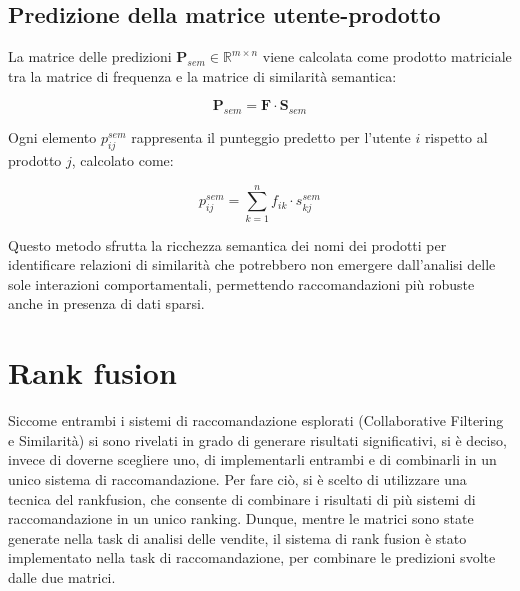 \subsection{Predizione della matrice utente-prodotto}

La matrice delle predizioni $\mathbf{P}_{sem} \in \mathbb{R}^{m \times n}$ viene calcolata come prodotto matriciale tra la matrice di frequenza e la matrice di similarità semantica:

\begin{equation}
\mathbf{P}_{sem} = \mathbf{F} \cdot \mathbf{S}_{sem}
\end{equation}

Ogni elemento $p_{ij}^{sem}$ rappresenta il punteggio predetto per l'utente $i$ rispetto al prodotto $j$, calcolato come:

\begin{equation}
p_{ij}^{sem} = \sum_{k=1}^{n} f_{ik} \cdot s_{kj}^{sem}
\end{equation}

Questo metodo sfrutta la ricchezza semantica dei nomi dei prodotti per identificare relazioni di similarità che potrebbero non emergere dall'analisi delle sole interazioni comportamentali, permettendo raccomandazioni più robuste anche in presenza di dati sparsi.


\section{Rank fusion}

Siccome entrambi i sistemi di raccomandazione esplorati (Collaborative Filtering e Similarità) si sono rivelati in grado di generare risultati significativi, si è deciso, invece di doverne scegliere uno, di implementarli entrambi e di combinarli in un unico sistema di raccomandazione. Per fare ciò, si è scelto di utilizzare una tecnica del \gls{rankfusion}, che consente di combinare i risultati di più sistemi di raccomandazione in un unico ranking.
Dunque, mentre le matrici sono state generate nella task di analisi delle vendite, il sistema di rank fusion è stato implementato nella task di raccomandazione, per combinare le predizioni svolte dalle due matrici.

